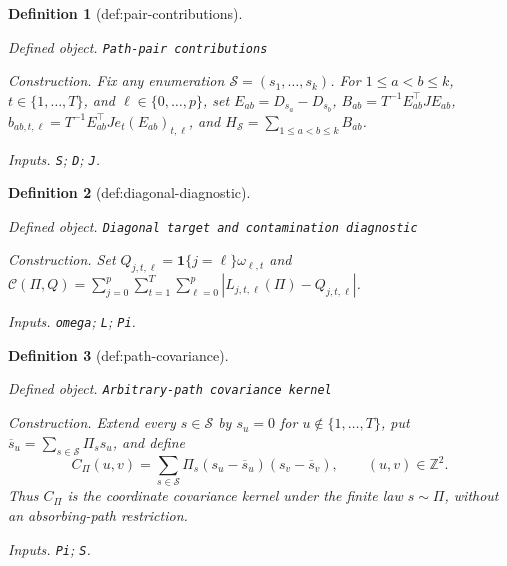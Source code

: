 \documentclass{article}
\newtheorem{definition}{Definition}
\begin{document}
\begin{definition}[def:pair-contributions]\label{def:pair-contributions}
\par\smallskip\noindent\emph{Defined object.} \texttt{Path-\allowbreak{}pair contributions}
\par\smallskip\noindent\emph{Construction.} Fix any enumeration \(\mathcal S=(s_1,\ldots,s_k)\).  For \(1\leq a<b\leq k\), \(t\in\{1,\ldots,T\}\), and \(\ell\in\{0,\ldots,p\}\), set \(E_{ab}=D_{s_a}-D_{s_b}\), \(B_{ab}=T^{-1}E_{ab}^{\top}JE_{ab}\), \(b_{ab,t,\ell}=T^{-1}E_{ab}^{\top}Je_t(E_{ab})_{t,\ell}\), and \(H_{\mathcal S}=\sum_{1\leq a<b\leq k}B_{ab}\).
\par\smallskip\noindent\emph{Inputs.} \texttt{S}; \texttt{D}; \texttt{J}.
\end{definition}

\begin{definition}[def:diagonal-diagnostic]\label{def:diagonal-diagnostic}
\par\smallskip\noindent\emph{Defined object.} \texttt{Diagonal target and contamination diagnostic}
\par\smallskip\noindent\emph{Construction.} Set \(Q_{j,t,\ell}=\mathbf 1\{j=\ell\}\omega_{\ell,t}\) and \(\mathcal C(\Pi,Q)=\sum_{j=0}^{p}\sum_{t=1}^{T}\sum_{\ell=0}^{p}|L_{j,t,\ell}(\Pi)-Q_{j,t,\ell}|\).
\par\smallskip\noindent\emph{Inputs.} \texttt{omega}; \texttt{L}; \texttt{Pi}.
\end{definition}

\begin{definition}[def:path-covariance]\label{def:path-covariance}
\par\smallskip\noindent\emph{Defined object.} \texttt{Arbitrary-\allowbreak{}path covariance kernel}
\par\smallskip\noindent\emph{Construction.} Extend every \(s\in\mathcal S\) by \(s_u=0\) for \(u\notin\{1,\ldots,T\}\), put \(\overline s_u=\sum_{s\in\mathcal S}\Pi_s s_u\), and define
\[
 C_{\Pi}(u,v)=\sum_{s\in\mathcal S}\Pi_s(s_u-\overline s_u)(s_v-\overline s_v),
 \qquad (u,v)\in\mathbb Z^2.
\]
Thus \(C_{\Pi}\) is the coordinate covariance kernel under the finite law \(s\sim\Pi\), without an absorbing-path restriction.
\par\smallskip\noindent\emph{Inputs.} \texttt{Pi}; \texttt{S}.
\end{definition}
\end{document}
